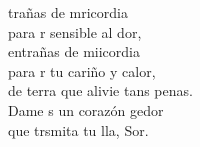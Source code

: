 \begin{cancion}%
	trañas de mricordia\\
	para r sensible al dor,\\
	entrañas de miicordia\\
	para r tu cariño y calor,\\
	de terra que alivie tans penas.\\
	Dame s un corazón gedor\\
	que trsmita tu lla, Sor.\\
\end{cancion}%
